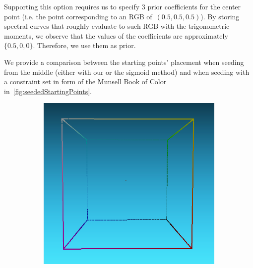 Supporting this option requires us to specify 3 prior coefficients for the center point (i.e. the point corresponding to an RGB of~$(0.5, 0.5, 0.5)$). By storing spectral curves that roughly evaluate to such RGB with the trigonometric moments, we observe that the values of the coefficients are approximately $\{0.5, 0, 0\}$. Therefore, we use them as prior.

We provide a comparison between the starting points' placement when seeding from the middle (either with our or the sigmoid method) and when seeding with a constraint set in form of the Munsell Book of Color in~\cref{fig:seededStartingPoints}.

\begin{figure}[t]
	\centering
	\captionsetup[subfigure]{font=footnotesize,labelfont=footnotesize}
	\captionsetup[subfigure]{justification=centering}
	\begin{subfigure}[t]{0.45\textwidth}
		\includegraphics[width=\linewidth]{img/seededStarting_sigmoid.png}
		\label{fig:seededStarting_sigmoid}
	\end{subfigure} \hspace{0.2em}
	\begin{subfigure}[t]{0.45\textwidth}

\end{subfigure}
\end{figure}
